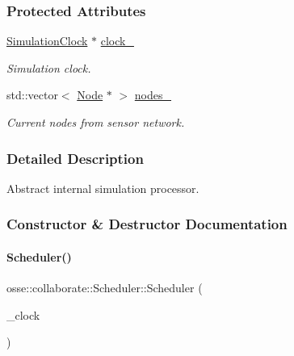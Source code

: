 \subsubsection*{Protected Attributes}
\begin{DoxyCompactItemize}
\item 
\mbox{\label{classosse_1_1collaborate_1_1_scheduler_ac1f31c1dbf1db5ad65e9bc04a0fad031}} 
\hyperlink{classosse_1_1collaborate_1_1_simulation_clock}{Simulation\+Clock} $\ast$ \hyperlink{classosse_1_1collaborate_1_1_scheduler_ac1f31c1dbf1db5ad65e9bc04a0fad031}{clock\+\_\+}
\begin{DoxyCompactList}\small\item\em Simulation clock. \end{DoxyCompactList}\item 
\mbox{\label{classosse_1_1collaborate_1_1_scheduler_a1b7f83b7ec18fe151bd52c6b8a066542}} 
std\+::vector$<$ \hyperlink{classosse_1_1collaborate_1_1_node}{Node} $\ast$ $>$ \hyperlink{classosse_1_1collaborate_1_1_scheduler_a1b7f83b7ec18fe151bd52c6b8a066542}{nodes\+\_\+}
\begin{DoxyCompactList}\small\item\em Current nodes from sensor network. \end{DoxyCompactList}\end{DoxyCompactItemize}


\subsubsection{Detailed Description}
Abstract internal simulation processor. 

\subsubsection{Constructor \& Destructor Documentation}
\mbox{\label{classosse_1_1collaborate_1_1_scheduler_a7052cb2998cbcce276e1c0b45b5aaa6a}} 
\paragraph{\texorpdfstring{Scheduler()}{Scheduler()}}
{\footnotesize\ttfamily osse\+::collaborate\+::\+Scheduler\+::\+Scheduler (\begin{DoxyParamCaption}\item[{\hyperlink{classosse_1_1collaborate_1_1_simulation_clock}{Simulation\+Clock} $\ast$}]{\+\_\+clock }\end{DoxyParamCaption})\hspace{0.3cm}{\ttfamily [explicit]}}



